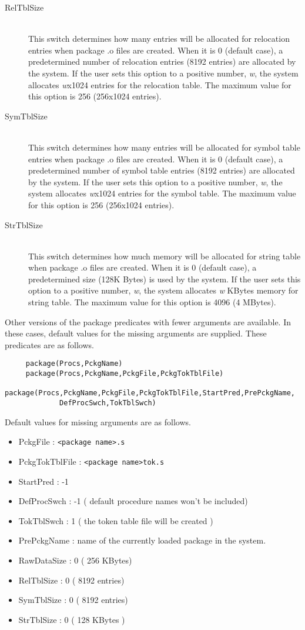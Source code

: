 \begin{description}
\item[RelTblSize] \ \\
This switch determines how many entries will be allocated for relocation entries
when package .o files are created. When it is 0 (default case), 
a predetermined number of relocation entries (8192 entries) 
are allocated by the system.
If the user sets this option to a positive number, \emph{w}, the system
allocates \emph{w}x1024 entries for the relocation table.  
The maximum value for this option is 256 (256x1024 entries).
\item[SymTblSize] \ \\
This switch determines how many entries will be allocated 
for symbol table entries
when package .o files are created. When it is 0 (default case), 
a predetermined number of symbol table entries (8192 entries) 
are allocated by the system.
If the user sets this option to a positive number, \emph{w}, the system
allocates \emph{w}x1024 entries for the symbol table.  
The maximum value for this option is 256 (256x1024 entries).
\item[StrTblSize] \ \\
This switch determines how much memory will be allocated 
for string table 
when package .o files are created. When it is 0 (default case), 
a predetermined size (128K Bytes) is used by the system.
If the user sets this option to a positive number, \emph{w}, the system
allocates \emph{w} KBytes memory for string table.  
The maximum value for this option is 4096 (4 MBytes).
\end{description}

Other versions of the package predicates with fewer arguments are
available. In these cases, default values for the missing arguments
are supplied. These predicates are as follows.

\begin{verbatim}
     package(Procs,PckgName)
     package(Procs,PckgName,PckgFile,PckgTokTblFile)
     package(Procs,PckgName,PckgFile,PckgTokTblFile,StartPred,PrePckgName,
             DefProcSwch,TokTblSwch)
\end{verbatim}
	
Default values for missing arguments are as follows.

\begin{itemize}
\item
PckgFile : \verb|<package name>.s|
\item
PckgTokTblFile : \verb|<package name>tok.s|
\item
StartPred : -1 
\item
DefProcSwch : -1 ( default procedure names won't be included)
\item
TokTblSwch : 1 ( the token table file will be created )
\item
PrePckgName : name of the currently loaded package in the system.
\item
RawDataSize : 0 ( 256 KBytes)
\item
RelTblSize : 0 ( 8192 entries)
\item
SymTblSize : 0 ( 8192 entries)
\item
StrTblSize : 0 ( 128 KBytes )
\end{itemize}


